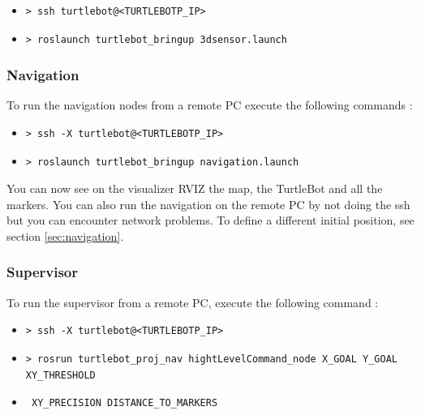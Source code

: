\documentclass[10pt,a4paper]{article}
\begin{document}
\begin{itemize}
\item[]  \begin{verbatim}> ssh turtlebot@<TURTLEBOTP_IP> \end{verbatim}
\item[]  \begin{verbatim}> roslaunch turtlebot_bringup 3dsensor.launch \end{verbatim}
\end{itemize}

\subsubsection{Navigation}

To run the navigation nodes from a remote PC execute the following commands :

\begin{itemize}
\item[]  \begin{verbatim}> ssh -X turtlebot@<TURTLEBOTP_IP> \end{verbatim}
\item[]  \begin{verbatim}> roslaunch turtlebot_bringup navigation.launch \end{verbatim}
\end{itemize}

You can now see on the visualizer RVIZ the map, the TurtleBot and all the markers. You can also run the navigation on the remote PC by not doing the ssh but you can encounter network problems. To define a different initial position, see section \ref{sec:navigation}.

\subsubsection{Supervisor}

To run the supervisor from a remote PC, execute the following command :

\begin{itemize}
\item[]  \begin{verbatim}> ssh -X turtlebot@<TURTLEBOTP_IP> \end{verbatim}
\item[]  \begin{verbatim}> rosrun turtlebot_proj_nav hightLevelCommand_node X_GOAL Y_GOAL XY_THRESHOLD  \end{verbatim}
\item[]  \begin{verbatim} XY_PRECISION DISTANCE_TO_MARKERS \end{verbatim}
\end{itemize}
\end{document}
